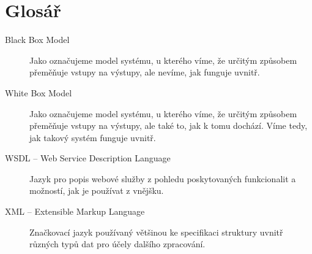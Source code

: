 \documentclass[thesis=M,czech]{FITthesis}[2012/06/26]
\begin{document}
\chapter{Glosář}
\begin{description}
	\item[Black Box Model] Jako  označujeme model systému, u kterého víme, že určitým způsobem přeměňuje vstupy na výstupy, ale nevíme, jak funguje uvnitř.
	\item[White Box Model] Jako  označujeme model systému, u kterého víme, že určitým způsobem přeměňuje vstupy na výstupy, ale také to, jak k tomu dochází. Víme tedy, jak takový systém funguje uvnitř.
	\item[WSDL – Web Service Description Language] Jazyk pro popis webové služby z pohledu poskytovaných funkcionalit a možností, jak je používat z vnějšku.
	\item[XML – Extensible Markup Language] Značkovací jazyk používaný většinou ke specifikaci struktury uvnitř různých typů dat pro účely dalšího zpracování.
\end{description}
\end{document}
